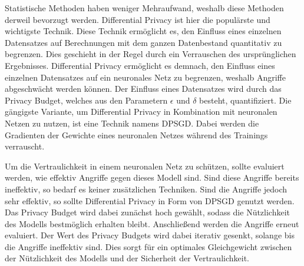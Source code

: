 Statistische Methoden haben weniger Mehraufwand, weshalb diese Methoden derweil bevorzugt werden. 
Differential Privacy ist hier die populärste und wichtigste Technik.
Diese Technik ermöglicht es, den Einfluss eines einzelnen Datensatzes auf Berechnungen mit dem ganzen Datenbestand quantitativ zu begrenzen.
Dies geschieht in der Regel durch ein Verrauschen des ursprünglichen Ergebnisses.
Differential Privacy ermöglicht es demnach, den Einfluss eines einzelnen Datensatzes auf ein neuronales Netz zu begrenzen, weshalb Angriffe abgeschwächt werden können.
Der Einfluss eines Datensatzes wird durch das Privacy Budget, welches aus den Parametern $\epsilon$ und $\delta$ besteht, quantifiziert.
Die gängigste Variante, um Differential Privacy in Kombination mit neuronalen Netzen zu nutzen, ist eine Technik namens DPSGD.
Dabei werden die Gradienten der Gewichte eines neuronalen Netzes während des Trainings verrauscht.

Um die Vertraulichkeit in einem neuronalen Netz zu schützen, sollte evaluiert werden, wie effektiv Angriffe gegen dieses Modell sind.
Sind diese Angriffe bereits ineffektiv, so bedarf es keiner zusätzlichen Techniken.
Sind die Angriffe jedoch sehr effektiv, so sollte Differential Privacy in Form von DPSGD genutzt werden.
Das Privacy Budget wird dabei zunächst hoch gewählt, sodass die Nützlichkeit des Modells bestmöglich erhalten bleibt.
Anschließend werden die Angriffe erneut evaluiert.
Der Wert des Privacy Budgets wird dabei iterativ gesenkt, solange bis die Angriffe ineffektiv sind.
Dies sorgt für ein optimales Gleichgewicht zwischen der Nützlichkeit des Modells und der Sicherheit der Vertraulichkeit.

